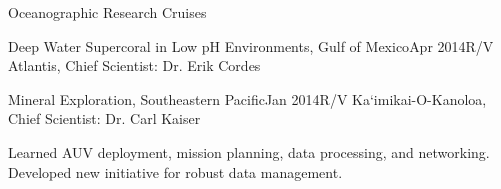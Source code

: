 \documentclass{resume} %
\begin{document}
\begin{rSection}{Oceanographic Research Cruises}
\begin{rSubsection}{Deep Water Supercoral in Low pH Environments, Gulf of Mexico}{Apr 2014}{R/V Atlantis, Chief Scientist: Dr. Erik Cordes}{}
\end{rSubsection}
\begin{rSubsection}{Mineral Exploration, Southeastern Pacific}{Jan 2014}{R/V Ka`imikai-O-Kanoloa, Chief Scientist: Dr. Carl Kaiser}{}
\item{Learned AUV deployment, mission planning, data processing, and networking. Developed new initiative for robust data management.}
\end{rSubsection}
\end{rSection}




%
%
%
%
%
%
\end{document}
